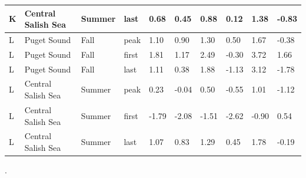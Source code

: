 \documentclass{article}
\begin{document}
\begin{table}[ht]
\begin{tabular}{|p{}|p{}|p{}|p{}|p{}p{}p{}|p{}p{}p{}|}
  K & Central Salish Sea & Summer & last & 0.68 & 0.45 & 0.88 & 0.12 & 1.38 & -0.83 \\ 
   \hline
L & Puget Sound & Fall & peak & 1.10 & 0.90 & 1.30 & 0.50 & 1.67 & -0.38 \\ 
  L & Puget Sound & Fall & first & 1.81 & 1.17 & 2.49 & -0.30 & 3.72 & 1.66 \\ 
  L & Puget Sound & Fall & last & 1.11 & 0.38 & 1.88 & -1.13 & 3.12 & -1.78 \\ 
  L & Central Salish Sea & Summer & peak & 0.23 & -0.04 & 0.50 & -0.55 & 1.01 & -1.12 \\ 
  L & Central Salish Sea & Summer & first & -1.79 & -2.08 & -1.51 & -2.62 & -0.90 & 0.54 \\ 
  L & Central Salish Sea & Summer & last & 1.07 & 0.83 & 1.29 & 0.45 & 1.78 & -0.19 \\ 
   \hline
\end{tabular}
\endgroup
\end{table}
\newpage
 .
 
 
 
\newpage
\end{document}
